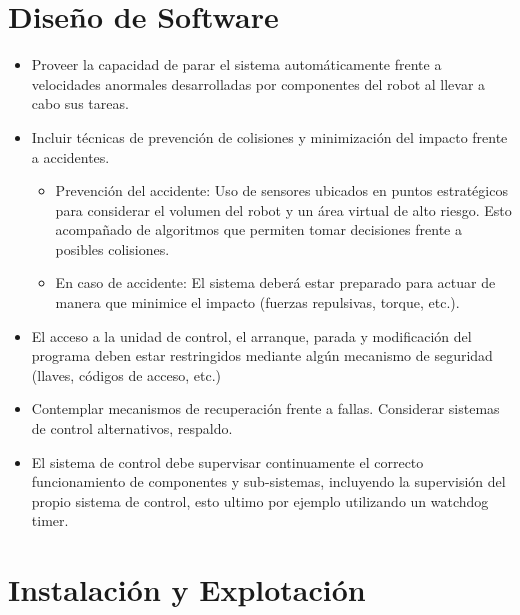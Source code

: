 \documentclass[withindex,glossary]{cam-thesis}
\begin{document}
\section{Diseño de Software} \label{sec: Guía Seguridad :: Diseño de Software}
\begin{itemize}
  \item Proveer la capacidad de parar el sistema automáticamente frente a velocidades anormales desarrolladas por componentes del robot al llevar a cabo sus tareas.
  \item Incluir técnicas de prevención de colisiones y minimización del impacto frente a accidentes.
    \begin{itemize}
        \item Prevención del accidente: Uso de sensores ubicados en puntos estratégicos para considerar el volumen del robot y un área virtual de alto riesgo. Esto acompañado de algoritmos que permiten tomar decisiones frente a posibles colisiones.
        \item En caso de accidente: El sistema deberá estar preparado para actuar de manera que minimice el impacto (fuerzas repulsivas, torque, etc.).
    \end{itemize}
  \item El acceso a la unidad de control, el arranque, parada y modificación del programa deben estar restringidos mediante algún mecanismo de seguridad (llaves, códigos de acceso, etc.)
  \item Contemplar mecanismos de recuperación frente a fallas. Considerar sistemas de control alternativos, respaldo.
  \item El sistema de control debe supervisar continuamente el correcto funcionamiento de componentes y sub-sistemas, incluyendo la supervisión del propio sistema de control, esto ultimo por ejemplo utilizando un watchdog timer.
\end{itemize}

\section{Instalación y Explotación} \label{sec: Guía Seguridad :: Instalación y Explotación}
\end{document}
